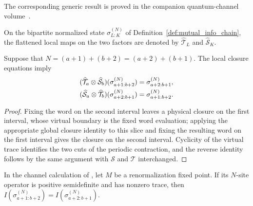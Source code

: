 The corresponding generic result is proved in the companion quantum-channel volume~\cite[``Data processing for bipartite mutual information'']{QICLean2026Blueprint}.


\begin{definition}
    \label{def:mpdo_split_normalized_mpo}
    \leanok
    On the bipartite normalized state $\sigma^{(N)}_{L:K}$ of
    Definition~\ref{def:mutual_info_chain}, the flattened local maps on the two
    factors are denoted by $\widehat{\mathcal T}_L$ and
    $\widehat{\mathcal S}_K$.
\end{definition}

\begin{lemma}
    \label{lem:mpdo_rfp_transfer_across_cut}
    \leanok
    Suppose that $N=(a+1)+(b+2)=(a+2)+(b+1)$. The local closure equations
    imply
    \begin{align}
        (\widehat{\mathcal T}_a\otimes\widehat{\mathcal S}_b)
        (\sigma^{(N)}_{a+1:b+2})
         & =\sigma^{(N)}_{a+2:b+1},
        \notag                      \\
        (\widehat{\mathcal S}_a\otimes\widehat{\mathcal T}_b)
        (\sigma^{(N)}_{a+2:b+1})
         & =\sigma^{(N)}_{a+1:b+2}.
        \notag
    \end{align}
\end{lemma}

\begin{proof}\leanok
    Fixing the word on the second interval leaves a physical closure on the
    first interval, whose virtual boundary is the fixed word evaluation;
    applying the appropriate global closure identity to this slice and fixing
    the resulting word on the first interval gives the closure on the second
    interval. Cyclicity of the virtual trace identifies the two cuts of the
    periodic contraction, and the reverse identity follows by the same argument
    with $\mathcal S$ and $\mathcal T$ interchanged.
\end{proof}

\begin{lemma}
    \label{thm:mpdo_rfp_split_mutual_information_eq}
    \leanok
    In the channel calculation of \cite[Appendix~C, lines~1333--1341]{Cirac2016MPDO_arXiv},
    let $M$ be a renormalization fixed point. If its $N$-site operator is
    positive semidefinite and has nonzero trace, then
    $I(\sigma^{(N)}_{a+1:b+2})
        =I(\sigma^{(N)}_{a+2:b+1})$.
\end{lemma}

